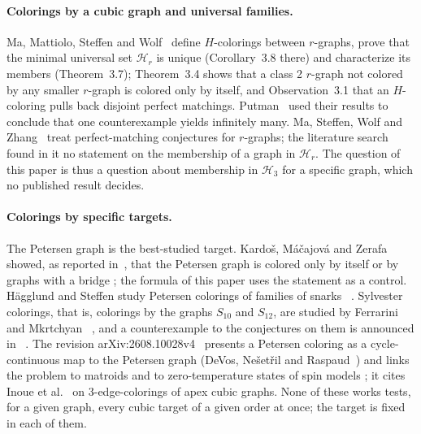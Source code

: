 \paragraph{Colorings by a cubic graph and universal families.} Ma, Mattiolo, Steffen and
Wolf~\cite{MMSW2025} \evV{} define $H$-colorings between $r$-graphs, prove that the minimal universal set
$\mathcal{H}_r$ is unique (Corollary~3.8 there) and characterize its members (Theorem~3.7); Theorem~3.4 shows
that a class 2 $r$-graph not colored by any smaller $r$-graph is colored only by itself, and Observation~3.1 that an
$H$-coloring pulls back disjoint perfect matchings. Putman~\cite{Putman2026} \evV{} used their results to
conclude that one counterexample yields infinitely many. Ma, Steffen, Wolf and Zhang~\cite{MaSWZ2024}
\evU{} treat perfect-matching conjectures for $r$-graphs; the literature search found in it no statement on
the membership of a graph in $\mathcal{H}_r$. The question of this paper is thus a question about membership in
$\mathcal{H}_3$ for a specific graph, which no published result decides.

\paragraph{Colorings by specific targets.} The Petersen graph is the best-studied target. Kardo\v{s},
M\'a\v{c}ajov\'a and Zerafa~\cite{KardosMZ} showed, as reported in~\cite[Section~5.4]{GJMMMU2026}, that the Petersen graph is
colored only by itself or by graphs with a bridge \evU{}; the formula of this paper uses the statement as a control.
H\"agglund and Steffen study Petersen colorings of families of snarks~\cite{HagglundSteffen2014} \evU{}. Sylvester
colorings, that is, colorings by the graphs $S_{10}$ and $S_{12}$, are studied by Ferrarini and
Mkrtchyan~\cite{FerrariniMkrtchyan2026} \evU{}, and a counterexample to the conjectures on them is announced
in~\cite{S10S12counter} \evU{}. The revision arXiv:2608.10028v4~\cite{GJMMMU2026} presents a Petersen
coloring as a cycle-continuous map to the Petersen graph (DeVos, Ne\v{s}et\v{r}il and Raspaud~\cite{DeVosNR}) and links the problem to
matroids and to zero-temperature states of spin models \evV{}; it cites
Inoue et al.~\cite{InoueEtAl2026} \evU{} on 3-edge-colorings of apex cubic graphs. None of these works tests, for
a given graph, every cubic target of a given order at once; the target is fixed in each of them.

